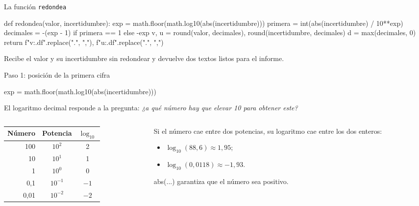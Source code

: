 \documentclass[10pt]{beamer}
\newcommand{\cod}[1]{{\setlength{\fboxsep}{1.4pt}\colorbox{codinline}{\textcolor{codrojo}{\ttfamily\small #1}}}}
\newcommand{\resalta}[1]{\textcolor{structure.fg!75!white}{#1}}
\begin{document}
\begin{frame}[fragile]{La función \texttt{redondea}}
  \begin{codigo}[listing options={style=python, basicstyle=\ttfamily\scriptsize\color{codtexto}}]
def redondea(valor, incertidumbre):
    exp = math.floor(math.log10(abs(incertidumbre)))
    primera = int(abs(incertidumbre) / 10**exp)
    decimales = -(exp - 1) if primera == 1 else -exp
    v, u = round(valor, decimales), round(incertidumbre, decimales)
    d = max(decimales, 0)
    return f"{v:.{d}f}".replace(".", ","), f"{u:.{d}f}".replace(".", ",")
  \end{codigo}
  Recibe el valor y su incertidumbre \resalta{sin redondear} y devuelve dos
  textos listos para el informe.
\end{frame}

\begin{frame}[fragile]{Paso 1: posición de la primera cifra}
  \begin{codigo}
exp = math.floor(math.log10(abs(incertidumbre)))
  \end{codigo}
  El \resalta{logaritmo decimal} responde a la pregunta: \emph{¿a qué número hay
  que elevar 10 para obtener este?}
  \begin{columns}[T]
    \begin{column}{0.4\textwidth}
      \centering\small
      \begin{tabular}{@{}rcc@{}}
        \toprule
        Número & Potencia & $\log_{10}$\\
        \midrule
        100 & $10^{2}$ & 2\\
        10 & $10^{1}$ & 1\\
        1 & $10^{0}$ & 0\\
        0,1 & $10^{-1}$ & $-1$\\
        0,01 & $10^{-2}$ & $-2$\\
        \bottomrule
      \end{tabular}
    \end{column}
    \begin{column}{0.56\textwidth}
      \small Si el número cae entre dos potencias, su logaritmo cae entre los dos
      enteros:
      \begin{itemize}
        \item $\log_{10}(88{,}6)\approx 1{,}95$;
        \item $\log_{10}(0{,}0118)\approx -1{,}93$.
      \end{itemize}
      \cod{abs(...)} garantiza que el número sea positivo.
    \end{column}
  \end{columns}
\end{frame}
\end{document}
